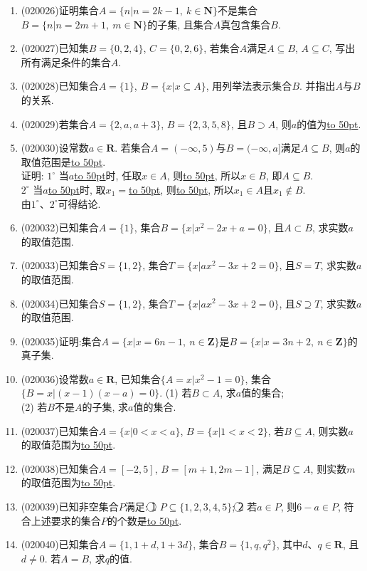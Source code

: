 \documentclass[10pt,a4paper]{article}
\newcommand{\blank}[1]{\underline{\hbox to #1pt{}}}
\begin{document}
\begin{enumerate}[1.]
\item {\tiny (020026)}证明集合$A=\{n|n=2k-1,\ k\in \mathbf{N}\}$不是集合$B=\{n|n=2m+1, \ m\in \mathbf{N}\}$的子集, 且集合$A$真包含集合$B$.
\item {\tiny (020027)}已知集$B=\{0, 2, 4\}$, $C=\{0, 2, 6\}$, 若集合$A$满足$A\subseteq B$, $A\subseteq C$, 写出所有满足条件的集合$A$.
\item {\tiny (020028)}已知集合$A=\{1\}$, $B=\{x|x\subseteq A\}$, 用列举法表示集合$B$. 并指出$A$与$B$的关系.
\item {\tiny (020029)}若集合$A=\{2,a,a+3\}$, $B=\{2,3,5,8\}$, 且$B\supset A$, 则$a$的值为\blank{50}.
\item {\tiny (020030)}设常数$a\in \mathbf{R}$. 若集合$A=(-\infty ,5)$与$B=(-\infty ,a]$满足$A\subseteq B$, 则$a$的取值范围是\blank{50}.\\
证明: $1^\circ$ 当$a$\blank{50}时, 任取$x\in A$, 则\blank{50}, 所以$x\in B$, 即$A\subseteq B$.\\ 
$2^\circ$ 当$a$\blank{50}时, 取$x_1=$\blank{50}, 则\blank{50}, 所以$x_1\in A$且$x_1\not \in B$.\\
由$1^\circ$、$2^\circ$可得结论.
\item {\tiny (020032)}已知集合$A=\{1\}$, 集合$B=\{x|x^2-2x+a=0\}$, 且$A\subset B$, 求实数$a$的取值范围.
\item {\tiny (020033)}已知集合$S=\{1, 2\}$, 集合$T=\{x|ax^2-3x+2=0\}$, 且$S=T$, 求实数$a$的取值范围.
\item {\tiny (020034)}已知集合$S=\{1, 2\}$, 集合$T=\{x|ax^2-3x+2=0\}$, 且$S\supseteq T$, 求实数$a$的取值范围.
\item {\tiny (020035)}证明:集合$A=\{x|x=6n-1, \ n\in\mathbf{Z}\}$是$B=\{x|x=3n+2, \ n\in\mathbf{Z}\}$的真子集.
\item {\tiny (020036)}设常数$a\in \mathbf{R}$, 已知集合$\{A=x|x^2-1=0\}$, 集合$\{B=x|(x-1)(x-a)=0\}$.
(1) 若$B\subset A$, 求$a$值的集合;\\
(2) 若$B$不是$A$的子集, 求$a$值的集合.
\item {\tiny (020037)}已知集合$A=\{x|0<x<a\}$, $B=\{x|1<x<2\}$, 若$B\subseteq A$, 则实数$a$的取值范围为\blank{50}.
\item {\tiny (020038)}已知集合$A=[-2,5]$, $B=[m+1,2m-1]$, 满足$B\subseteq A$, 则实数$m$的取值范围为\blank{50}.
\item {\tiny (020039)}已知非空集合$P$满足: \textcircled{1} $P\subseteq \{1,2,3,4,5\}$; \textcircled{2} 若$a\in P$, 则$6-a\in P$, 符合上述要求的集合$P$的个数是\blank{50}.
\item {\tiny (020040)}已知集合$A=\{1, 1+d, 1+3d\}$, 集合$B=\{1, q, q^2\}$, 其中$d$、$q\in \mathbf{R}$, 且$d\ne 0$. 若$A=B$, 求$q$的值.

\end{enumerate}
\end{document}
